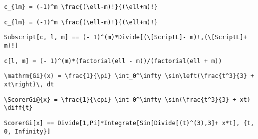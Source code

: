 \newsavebox\BGT
\begin{lrbox}{\BGT}
 \begin{minipage}[t]{0.82\textwidth}
  \lstinline[language={[latex]TeX},mathescape,breaklines=true]"c_{lm} = (-1)^m \frac{(\ell-m)!}{(\ell+m)!}"
 \end{minipage}
\end{lrbox}
\newsavebox\BGST
\begin{lrbox}{\BGST}
 \begin{minipage}[t]{0.82\textwidth}
  \lstinline[language={[latex]TeX},mathescape,breaklines=true]"c_{lm} = (-1)^m \frac{(\ell-m)!}{(\ell+m)!}"
 \end{minipage}
\end{lrbox}
\newsavebox\BGMM
\begin{lrbox}{\BGMM}
 \begin{minipage}[t]{0.82\textwidth}
  \lstinline[language={[latex]TeX},mathescape,breaklines=true]"Subscript[c, l, m] == (- 1)^(m)*Divide[(\[ScriptL]- m)!,(\[ScriptL]+ m)!]"
 \end{minipage}
\end{lrbox}
\newsavebox\BGMA
\begin{lrbox}{\BGMA}
 \begin{minipage}[t]{0.82\textwidth}
  \lstinline[language={[latex]TeX},mathescape,breaklines=true]"c[l, m] = (- 1)^(m)*(factorial(ell - m))/(factorial(ell + m))"
 \end{minipage}
\end{lrbox}
\newsavebox\BHT
\begin{lrbox}{\BHT}
 \begin{minipage}[t]{0.82\textwidth}
  \lstinline[language={[latex]TeX},mathescape,breaklines=true]"\mathrm{Gi}(x) = \frac{1}{\pi} \int_0^\infty \sin\left(\frac{t^3}{3} + xt\right)\, dt"
 \end{minipage}
\end{lrbox}
\newsavebox\BHST
\begin{lrbox}{\BHST}
 \begin{minipage}[t]{0.82\textwidth}
  \lstinline[language={[latex]TeX},mathescape,breaklines=true]"\ScorerGi@{x} = \frac{1}{\cpi} \int_0^\infty \sin(\frac{t^3}{3} + xt) \diff{t}"
 \end{minipage}
\end{lrbox}
\newsavebox\BHMM
\begin{lrbox}{\BHMM}
 \begin{minipage}[t]{0.82\textwidth}
  \lstinline[language={[latex]TeX},mathescape,breaklines=true]"ScorerGi[x] == Divide[1,Pi]*Integrate[Sin[Divide[(t)^(3),3]+ x*t], {t, 0, Infinity}]"
 \end{minipage}
\end{lrbox}
